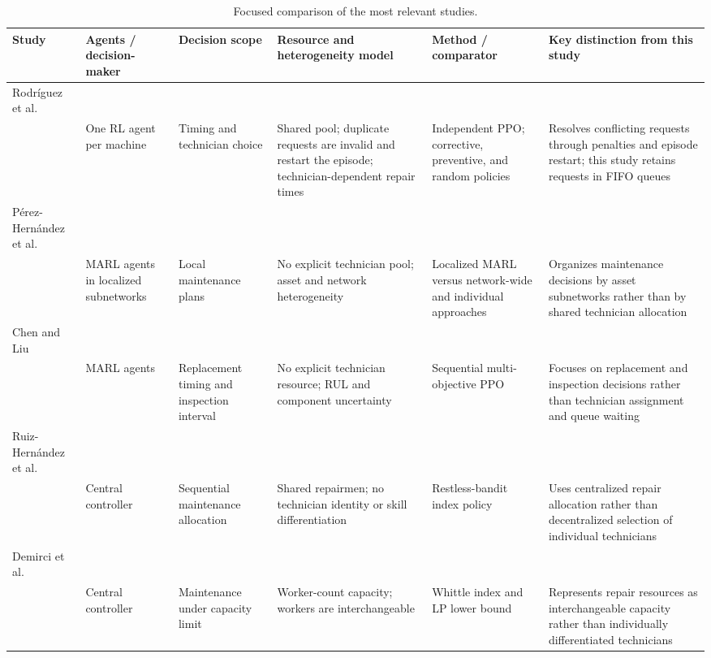 \documentclass[11pt]{article}
\begin{document}
\begin{table}[H]
\centering
\caption{Focused comparison of the most relevant studies.}
\label{tab:related-work}
\scriptsize
\renewcommand{\arraystretch}{1.10}
\setlength{\tabcolsep}{3pt}
\begin{tabularx}{\linewidth}{
    >{\raggedright\arraybackslash}p{2.05cm}
    >{\raggedright\arraybackslash}p{1.90cm}
    >{\raggedright\arraybackslash}p{2.45cm}
    >{\raggedright\arraybackslash}p{3.65cm}
    >{\raggedright\arraybackslash}p{2.75cm}
    >{\raggedright\arraybackslash}X}
\toprule
Study & Agents / decision-maker & Decision scope & Resource and heterogeneity model & Method / comparator & Key distinction from this study \\
\midrule
Rodríguez et al.\\\cite{rodriguez2022} & One RL agent per machine & Timing and technician choice & Shared pool; duplicate requests are invalid and restart the episode; technician-dependent repair times & Independent PPO; corrective, preventive, and random policies & Resolves conflicting requests through penalties and episode restart; this study retains requests in FIFO queues \\
\arrayrulecolor{gray!35}\midrule
Pérez-Hernández et al.\\\cite{perez2024} & MARL agents in localized subnetworks & Local maintenance plans & No explicit technician pool; asset and network heterogeneity & Localized MARL versus network-wide and individual approaches & Organizes maintenance decisions by asset subnetworks rather than by shared technician allocation \\
\midrule
Chen and Liu\\\cite{chen2025} & MARL agents & Replacement timing and inspection interval & No explicit technician resource; RUL and component uncertainty & Sequential multi-objective PPO & Focuses on replacement and inspection decisions rather than technician assignment and queue waiting \\
\midrule
Ruiz-Hernández et al.\\\cite{ruiz2020} & Central controller & Sequential maintenance allocation & Shared repairmen; no technician identity or skill differentiation & Restless-bandit index policy & Uses centralized repair allocation rather than decentralized selection of individual technicians \\
\midrule
Demirci et al.\\\cite{demirci2024} & Central controller & Maintenance under capacity limit & Worker-count capacity; workers are interchangeable & Whittle index and LP lower bound & Represents repair resources as interchangeable capacity rather than individually differentiated technicians \\

\end{tabularx}
\end{table}
\end{document}

